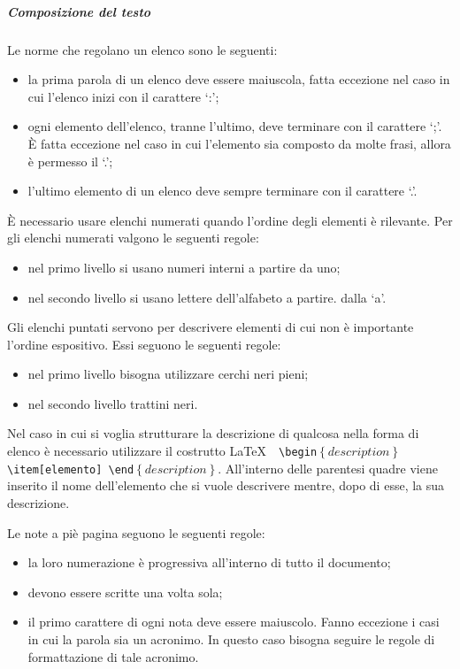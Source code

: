\documentclass[../NormeProgetto.tex]{subfiles}
\begin{document}
		\subparagraph{Composizione del testo}
			Le norme che regolano un elenco sono le seguenti:
			\begin{itemize}
				\item la prima parola di un elenco deve essere maiuscola, fatta eccezione nel caso in cui l'elenco inizi con il carattere `:';
				\item ogni elemento dell'elenco, tranne l'ultimo, deve terminare con il carattere `;'. È fatta eccezione nel caso in cui l'elemento sia composto da molte frasi, allora è permesso il `.';
				\item l'ultimo elemento di un elenco deve sempre terminare con il carattere `.'.
			\end{itemize}
È necessario usare elenchi numerati quando l'ordine degli elementi è rilevante. Per gli elenchi numerati valgono le seguenti regole:
			\begin{itemize}
				\item nel primo livello si usano numeri interni a partire da uno;
				\item nel secondo livello si usano lettere dell'alfabeto a partire. dalla `a'.
			\end{itemize}
Gli elenchi puntati servono per descrivere elementi di cui non è importante l'ordine espositivo. Essi seguono le seguenti regole:
			\begin{itemize}
				\item nel primo livello bisogna utilizzare cerchi neri pieni;
				\item nel secondo livello trattini neri.
			\end{itemize}
			
			
			Nel caso in cui si voglia strutturare la descrizione di qualcosa nella forma di elenco è necessario utilizzare il costrutto \LaTeX\ \texttt{ \textbackslash begin$\left\{description\right\}$ \textbackslash item[elemento] \textbackslash end$\left\{description\right\}$}. All'interno delle parentesi quadre viene inserito il nome dell'elemento che si vuole descrivere mentre, dopo di esse, la sua descrizione.					
			
			Le note a piè pagina seguono le seguenti regole:
			\begin{itemize}
				\item la loro numerazione è progressiva all'interno di tutto il documento;
				\item devono essere scritte una volta sola;
				\item il primo carattere di ogni nota deve essere maiuscolo. Fanno eccezione i casi in cui la parola sia un acronimo. In questo caso bisogna seguire le regole di formattazione di tale acronimo.
			\end{itemize}
			
\end{document}
